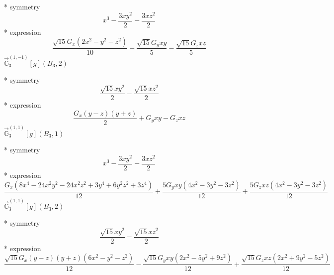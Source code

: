 \documentclass[fleqn,8pt]{jsarticle}
\begin{document}
\noindent\quad ** symmetry
\begin{dmath*}
x^{3} - \frac{3 x y^{2}}{2} - \frac{3 x z^{2}}{2}
\end{dmath*}
\noindent\quad ** expression
\begin{dmath*}
\frac{\sqrt{15} G_{x} \left(2 x^{2} - y^{2} - z^{2}\right)}{10} - \frac{\sqrt{15} G_{y} x y}{5} - \frac{\sqrt{15} G_{z} x z}{5}
\end{dmath*}
\noindent\quad $\vec{\mathbb{G}}_{3}^{(1,-1)}[g](B_{3},2)$

\noindent\quad ** symmetry
\begin{dmath*}
\frac{\sqrt{15} x y^{2}}{2} - \frac{\sqrt{15} x z^{2}}{2}
\end{dmath*}
\noindent\quad ** expression
\begin{dmath*}
\frac{G_{x} \left(y - z\right) \left(y + z\right)}{2} + G_{y} x y - G_{z} x z
\end{dmath*}
\noindent\quad $\vec{\mathbb{G}}_{3}^{(1,1)}[g](B_{3},1)$

\noindent\quad ** symmetry
\begin{dmath*}
x^{3} - \frac{3 x y^{2}}{2} - \frac{3 x z^{2}}{2}
\end{dmath*}
\noindent\quad ** expression
\begin{dmath*}
\frac{G_{x} \left(8 x^{4} - 24 x^{2} y^{2} - 24 x^{2} z^{2} + 3 y^{4} + 6 y^{2} z^{2} + 3 z^{4}\right)}{12} + \frac{5 G_{y} x y \left(4 x^{2} - 3 y^{2} - 3 z^{2}\right)}{12} + \frac{5 G_{z} x z \left(4 x^{2} - 3 y^{2} - 3 z^{2}\right)}{12}
\end{dmath*}
\noindent\quad $\vec{\mathbb{G}}_{3}^{(1,1)}[g](B_{3},2)$

\noindent\quad ** symmetry
\begin{dmath*}
\frac{\sqrt{15} x y^{2}}{2} - \frac{\sqrt{15} x z^{2}}{2}
\end{dmath*}
\noindent\quad ** expression
\begin{dmath*}
\frac{\sqrt{15} G_{x} \left(y - z\right) \left(y + z\right) \left(6 x^{2} - y^{2} - z^{2}\right)}{12} - \frac{\sqrt{15} G_{y} x y \left(2 x^{2} - 5 y^{2} + 9 z^{2}\right)}{12} + \frac{\sqrt{15} G_{z} x z \left(2 x^{2} + 9 y^{2} - 5 z^{2}\right)}{12}
\end{dmath*}
\end{document}
